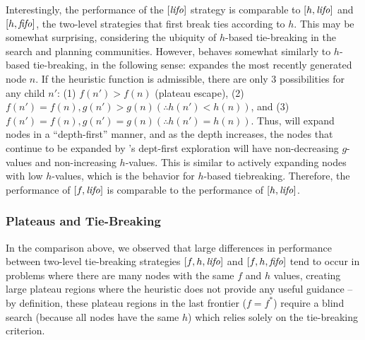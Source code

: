 Interestingly, the performance of the $[\mbox{\textit{lifo}}]$ strategy
is comparable to $[h,\mbox{\textit{lifo}}]$ and $[h,\mbox{\textit{fifo}}]$, the two-level strategies that first break ties according to $h$.
This may be somewhat surprising, considering the ubiquity of $h$-based tie-breaking in the search and planning communities.
% 
However, \lifo behaves somewhat similarly to $h$-based tie-breaking, in the following sense:
\lifo expandes the most recently generated node $n$.
If the heuristic function is admissible, there are only 3 possibilities for any child $n'$: 
(1) $f(n') > f(n)$  (plateau escape), 
(2) $f(n') = f(n), g(n') > g(n) (\therefore h(n') < h(n))$, and 
(3) $f(n') = f(n), g(n') = g(n) (\therefore h(n') = h(n))$.
Thus, \lifo will expand nodes in a ``depth-first'' manner, and as the depth increases,
the nodes that continue to be expanded by \lifo's 
dept-first exploration will have non-decreasing $g$-values and non-increasing $h$-values.
This is similar to actively expanding nodes with low $h$-values, which is the behavior for $h$-based tiebreaking.
Therefore, the performance of $[f,\mbox{\textit{lifo}}]$ is comparable to the performance of $[h,\mbox{\textit{lifo}}]$.


\subsubsection{Plateaus and Tie-Breaking}

In the comparison
above, we observed that large differences in performance between
two-level tie-breaking strategies $[f,h,\mbox{\textit{lifo}}]$ and $[f,h,\mbox{\textit{fifo}}]$ tend
to occur in problems where there are many nodes with the same $f$ and
$h$ values, creating large plateau regions where the heuristic does not
provide any useful guidance -- by definition, these plateau regions in
the last frontier ($f=f^*$) require a blind search (because all nodes
have the same $h$) which relies solely on the tie-breaking criterion.


